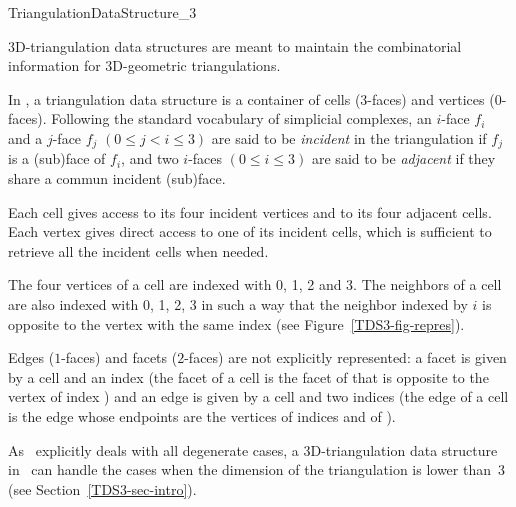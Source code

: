 

\begin{ccRefConcept}{TriangulationDataStructure_3}


\ccDefinition

3D-triangulation data structures are meant to maintain the
combinatorial information for 3D-geometric triangulations.

In \cgal, a triangulation data structure is a container of cells
($3$-faces) and vertices ($0$-faces). Following the standard
vocabulary of simplicial complexes, an $i$-face $f_i$ and a $j$-face
$f_j$ $(0 \leq j < i \leq 3)$ are said to be \textit{incident} in the
triangulation if $f_j$ is a (sub)face of $f_i$, and two $i$-faces $(0
\leq i \leq 3)$ are said to be \textit{adjacent} if they share a
commun incident (sub)face.

Each cell gives
access to its four incident vertices and to its four adjacent
cells. Each vertex gives direct access to one of its incident cells, which is 
sufficient to retrieve all the incident cells when needed.

The four vertices of a cell are indexed with 0, 1, 2 and 3.  The
neighbors of a cell are also indexed with 0, 1, 2, 3 
in such a way that the neighbor indexed by $i$ is opposite to the vertex
with the same index (see Figure~\ref{TDS3-fig-repres}).

Edges ($1$-faces) and facets ($2$-faces) are not explicitly
represented: a facet is given by a cell and an index (the facet
 of a cell  is the facet of  that is opposite to
the vertex of index ) and an edge is given by a cell and two
indices (the edge  of a cell  is the edge
whose endpoints are the vertices of indices  and  of
). 

As \cgal\ explicitly deals with all degenerate cases, a
3D-triangulation data structure in \cgal\ can handle the cases when
the dimension of the triangulation is lower than~3 
(see Section~\ref{TDS3-sec-intro}).


\end{ccRefConcept}
